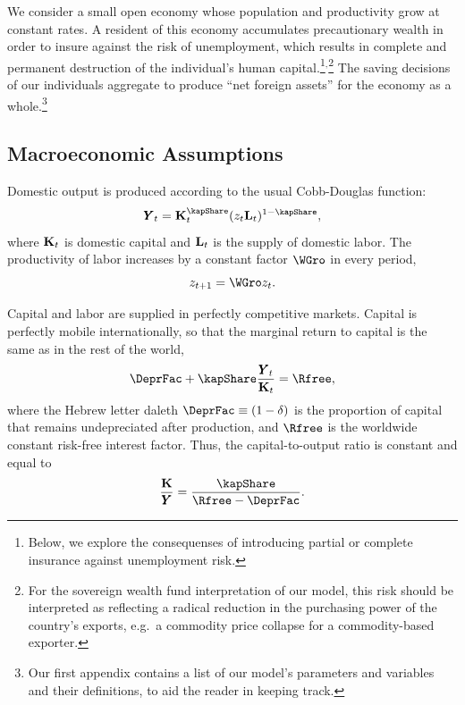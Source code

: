 \documentclass[titlepage]{\econtex}\newcommand{\texname}{cjSOE}
\renewcommand{\GDPLev}{\ensuremath{\pmb{Y}}}
\renewcommand{\ptyLev}{\ensuremath{z}}
\begin{document}
We consider a small open economy whose population and productivity
grow at constant rates. A resident of this economy accumulates
precautionary wealth in order to insure against the risk of
unemployment, which results in complete and permanent destruction of
the individual's human capital.\footnote{Below, we explore the
  consequenses of introducing partial or complete insurance against
  unemployment risk.}$^{,}$\footnote{For the sovereign
  wealth fund interpretation of our model, this risk should be
  interpreted as reflecting a radical reduction in the purchasing
  power of the country's exports, e.g.\ a commodity price collapse for
  a commodity-based exporter.}
The saving decisions of our individuals aggregate to produce ``net
foreign assets'' for the economy as a whole.\footnote{Our first
  appendix contains a list of our model's parameters and variables and
  their definitions, to aid the reader in keeping track.}


\subsection{Macroeconomic Assumptions}

Domestic output is produced according to the usual Cobb-Douglas function:
\begin{equation}
\GDPLev_t=\KLev_t^{\kapShare}(\ptyLev_t \LLev_t)^{1-\kapShare},
\label{eq:Cobb-Douglas}
\end{equation}
where $\mathbf{K}_t$ is domestic capital and $\mathbf{L}_t$ is the supply of domestic labor. The productivity of labor increases by a constant factor $\WGro$ in every period,
\begin{equation*}
\ptyLev_{t+1}=\WGro \ptyLev_t.
\end{equation*}

Capital and labor are supplied in perfectly competitive markets. Capital is perfectly mobile internationally, so that the marginal return to capital is the same as in the rest of the world,
\begin{equation}
\DeprFac+\kapShare \frac{\GDPLev_t}{\KLev_t}=\Rfree,
\label{eq:MPK}
\end{equation}
where the Hebrew letter daleth $\DeprFac \equiv (1-\delta)$ is the proportion of capital that remains undepreciated after production, and $\Rfree$ is the worldwide constant risk-free interest factor. Thus, the capital-to-output ratio is constant and equal to
\begin{equation}
\frac{\KLev}{\GDPLev}=\frac{\kapShare}{\Rfree-\DeprFac}.
\label{eq:KOyLev} %
\end{equation}
\end{document}
